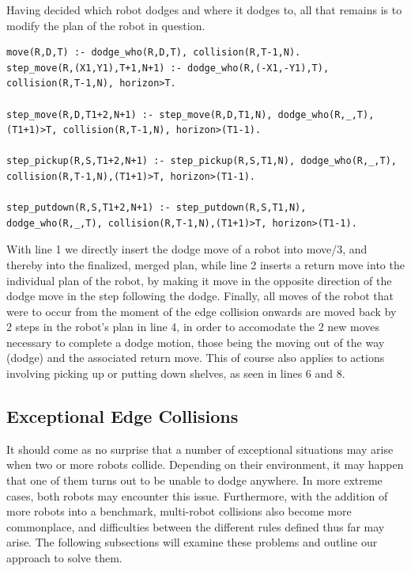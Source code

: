 \documentclass{llncs}
\begin{document}
Having decided which robot dodges and where it dodges to, all that remains is to modify the plan of the robot in question.\newpage
\begin{lstlisting}[basicstyle=\fontsize{9}{11}\selectfont\ttfamily,frame=single,breaklines=true]
move(R,D,T) :- dodge_who(R,D,T), collision(R,T-1,N).
step_move(R,(X1,Y1),T+1,N+1) :- dodge_who(R,(-X1,-Y1),T), collision(R,T-1,N), horizon>T.

step_move(R,D,T1+2,N+1) :- step_move(R,D,T1,N), dodge_who(R,_,T), (T1+1)>T, collision(R,T-1,N), horizon>(T1-1).

step_pickup(R,S,T1+2,N+1) :- step_pickup(R,S,T1,N), dodge_who(R,_,T), collision(R,T-1,N),(T1+1)>T, horizon>(T1-1).

step_putdown(R,S,T1+2,N+1) :- step_putdown(R,S,T1,N), dodge_who(R,_,T), collision(R,T-1,N),(T1+1)>T, horizon>(T1-1).

\end{lstlisting}
With line 1 we directly insert the dodge move of a robot into move/3, and thereby into the finalized, merged plan, while line 2 inserts a return move into the individual plan of the robot, by making it move in the opposite direction of the dodge move in the step following the dodge. \newline Finally, all moves of the robot that were to occur from the moment of the edge collision onwards are moved back by 2 steps in the robot's plan in line 4, in order to accomodate the 2 new moves necessary to complete a dodge motion, those being the moving out of the way (dodge) and the associated return move. This of course also applies to actions involving picking up or putting down shelves, as seen in lines 6 and 8.

\subsection{Exceptional Edge Collisions}
It should come as no surprise that a number of exceptional situations may arise when two or more robots collide. Depending on their environment, it may happen that one of them turns out to be unable to dodge anywhere. In more extreme cases, both robots may encounter this issue. Furthermore, with the addition of more robots into a benchmark, multi-robot collisions also become more commonplace, and difficulties between the different rules defined thus far may arise. \newline The following subsections will examine these problems and outline our approach to solve them.
\end{document}
